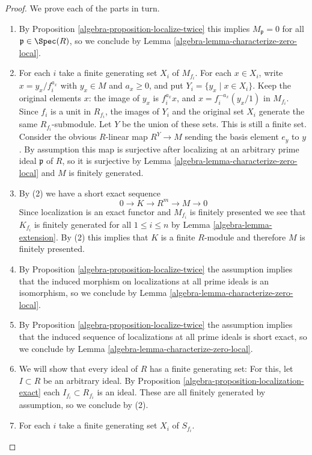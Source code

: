 \begin{proof}
We prove each of the parts in turn.
\begin{enumerate}
\item By Proposition \ref{algebra-proposition-localize-twice}
this implies $M_\mathfrak p = 0$ for all $\mathfrak p \in \Spec(R)$,
so we conclude by Lemma \ref{algebra-lemma-characterize-zero-local}.
\item For each $i$ take a finite generating set $X_i$ of $M_{f_i}$.
For each $x\in X_i$, write $x=y_x/f_i^{a_x}$ with
$y_x\in M$ and $a_x\geq0$, and put $Y_i=\{y_x\mid x\in X_i\}$.
Keep the original elements $x$: the image of $y_x$ is $f_i^{a_x}x$,
and $x=f_i^{-a_x}(y_x/1)$ in $M_{f_i}$.
Since $f_i$ is a unit in $R_{f_i}$, the images of $Y_i$ and the
original set $X_i$ generate the same $R_{f_i}$-submodule. Let $Y$
be the union of these sets. This is still a finite set.
Consider the obvious $R$-linear map $R^Y \rightarrow M$ sending the basis
element $e_y$ to $y$. By assumption this map is surjective after localizing
at an arbitrary prime ideal $\mathfrak p$ of $R$, so it is surjective by
Lemma \ref{algebra-lemma-characterize-zero-local}
and $M$ is finitely generated.
\item By (2) we have a short exact sequence
$$
0 \rightarrow K \rightarrow R^m \rightarrow M \rightarrow 0
$$
Since localization is an exact functor and $M_{f_i}$ is finitely
presented we see that $K_{f_i}$ is finitely generated for all
$1 \leq i \leq n$ by Lemma \ref{algebra-lemma-extension}.
By (2) this implies that $K$ is a finite $R$-module and therefore
$M$ is finitely presented.
\item By Proposition \ref{algebra-proposition-localize-twice}
the assumption implies that the induced morphism
on localizations at all prime ideals is an isomorphism, so we conclude
by Lemma \ref{algebra-lemma-characterize-zero-local}.
\item By Proposition \ref{algebra-proposition-localize-twice} the assumption
implies that the induced
sequence of localizations at all prime ideals is short exact, so we
conclude by Lemma \ref{algebra-lemma-characterize-zero-local}.
\item We will show that every ideal of $R$ has a finite generating set:
For this, let $I \subset R$ be an arbitrary ideal. By
Proposition \ref{algebra-proposition-localization-exact}
each $I_{f_i} \subset R_{f_i}$ is an ideal. These are all
finitely generated by assumption, so we conclude by (2).
\item For each $i$ take a finite generating set $X_i$ of $S_{f_i}$.

\end{enumerate}
\end{proof}
